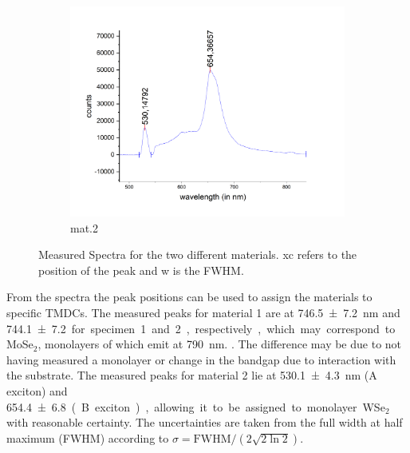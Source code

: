 \begin{figure}[!ht]
\begin{subfigure}{0.7\textwidth}
        \centering
        \includegraphics[width=\textwidth]{img/output_t1/spekt_m2}
        \caption{mat.2}
	      \label{fig_mono_spec3_1dspec}
    \end{subfigure}
    \caption{Measured Spectra for the two different materials. xc refers to the position of the peak and w is the FWHM.}
	\label{fig_mono_1dspectra} %
\end{figure}

From the spectra the peak positions can be used to assign the materials to specific TMDCs.
The measured peaks for material 1 are at \SI{746,5\pm 7,2}{nm} and \SI{744,1 \pm 7,2} for specimen 1 and 2, respectively, which may correspond to MoSe$_2$, monolayers of which emit at \SI{790}{nm}. \cite{Tonndorf2013}.
The difference may be due to not having measured a monolayer or change in the bandgap due to interaction with the substrate.
The measured peaks for material 2 lie at \SI{530,1 \pm 4,3}{nm} (A exciton) and \SI{654,4 \pm 6,8} (B exciton), allowing it to be assigned to monolayer WSe$_2$ with reasonable certainty.
The uncertainties are taken from the full width at half maximum (FWHM) according to $\sigma = \mathrm{FWHM}/(2\sqrt{2 \ln 2})$.
